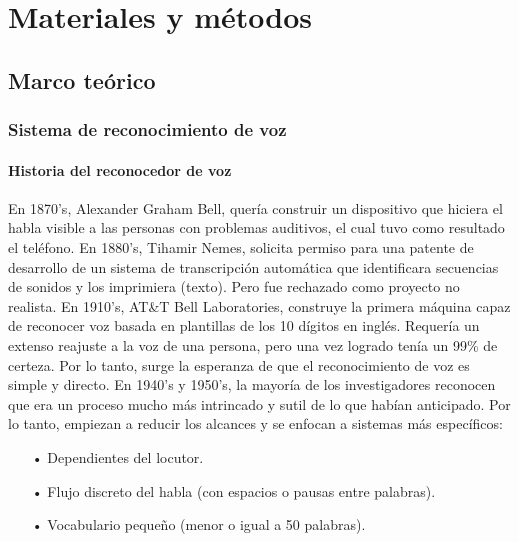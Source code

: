 \chapter{Materiales y métodos}
\section{Marco teórico}
\subsection{Sistema de reconocimiento de voz}

\subsubsection{Historia del reconocedor de voz}
En 1870’s, Alexander Graham Bell, quería construir un dispositivo que hiciera el habla visible a las personas con problemas auditivos, el cual tuvo como resultado el teléfono.
\vskip 0.5cm
En 1880’s, Tihamir Nemes, solicita permiso para una patente de desarrollo de un sistema de transcripción automática que identificara secuencias de sonidos y los imprimiera (texto). Pero fue rechazado como proyecto no realista.
\vskip 0.5cm
En 1910’s, AT\&T Bell Laboratories, construye la primera máquina capaz de reconocer voz basada en plantillas de los 10 dígitos en inglés. Requería un extenso reajuste a la voz de una persona, pero una vez logrado tenía un 99\% de certeza. Por lo tanto, surge la esperanza de que el reconocimiento de voz es simple y directo.
\vskip 0.5cm
En 1940’s y 1950’s, la mayoría de los investigadores reconocen que era un proceso mucho más intrincado y sutil de lo que habían anticipado. Por lo tanto, empiezan a reducir los alcances y se enfocan a sistemas más específicos:

\begin{enumerate}
\item[•]Dependientes del locutor.
\item[•]Flujo discreto del habla (con espacios o pausas entre palabras).
\item[•]Vocabulario pequeño (menor o igual a 50 palabras).
\end{enumerate}

